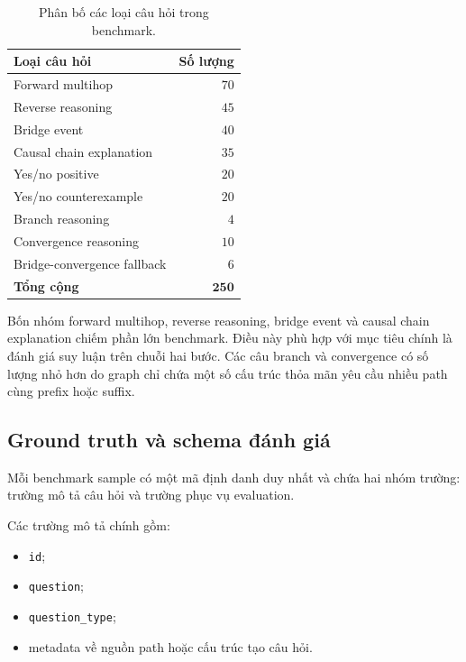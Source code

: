 \begin{table}[t]
    \centering
    \caption{Phân bố các loại câu hỏi trong benchmark.}
    \label{tab:benchmark}
    \begin{tabular}{lr}
        \hline
        \textbf{Loại câu hỏi} & \textbf{Số lượng} \\
        \hline
        Forward multihop & \(70\) \\
        Reverse reasoning & \(45\) \\
        Bridge event & \(40\) \\
        Causal chain explanation & \(35\) \\
        Yes/no positive & \(20\) \\
        Yes/no counterexample & \(20\) \\
        Branch reasoning & \(4\) \\
        Convergence reasoning & \(10\) \\
        Bridge-convergence fallback & \(6\) \\
        \hline
        \textbf{Tổng cộng} & \(\mathbf{250}\) \\
        \hline
    \end{tabular}
\end{table}

Bốn nhóm forward multihop, reverse reasoning, bridge event và causal chain
explanation chiếm phần lớn benchmark. Điều này phù hợp với mục tiêu chính là
đánh giá suy luận trên chuỗi hai bước. Các câu branch và convergence có số
lượng nhỏ hơn do graph chỉ chứa một số cấu trúc thỏa mãn yêu cầu nhiều path
cùng prefix hoặc suffix.

\subsection{Ground truth và schema đánh giá}

Mỗi benchmark sample có một mã định danh duy nhất và chứa hai nhóm trường:
trường mô tả câu hỏi và trường phục vụ evaluation.

Các trường mô tả chính gồm:

\begin{itemize}
    \item \texttt{id};
    \item \texttt{question};
    \item \texttt{question\_type};
    \item metadata về nguồn path hoặc cấu trúc tạo câu hỏi.
\end{itemize}

